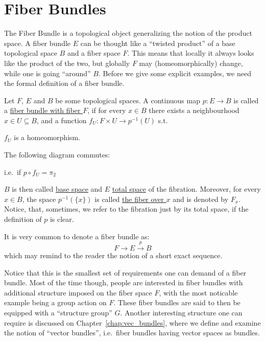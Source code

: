 \chapter{Fiber Bundles}
The Fiber Bundle is a topological object generalizing the notion of the product space. A fiber bundle $E$ can be thought like a ``twisted product'' of a base topological space $B$ and a fiber space $F$. This means that locally it always looks like the product of the two, but globally $F$ may (homeomorphically) change, while one is going ``around'' $B$. Before we give some explicit examples, we need the formal definition of a fiber bundle.

\begin{definition} Let $F$, $E$ and $B$ be some topological spaces. A continuous map $p:E\to B$ is called a \ul{fiber bundle with fiber $F$}, if for every $x\in B$ there exists a neighbourhood $x\in U\subseteq B$, and a function $f_U:F\times U\to p^{-1}(U)$ s.t.
\begin{i_enum}
\item $f_U$ is a homeomorphism.
\item The following diagram commutes:
\begin{center}
\end{center}
i.e.\ if $p\circ f_U=\pi_2$
\end{i_enum}
$B$ is then called \ul{base space} and $E$ \ul{total space} of the fibration. Moreover, for every $x\in B$, the space $p^{-1}(\{x\})$ is called \ul{the fiber over $x$} and is denoted by $F_x$. Notice, that, sometimes, we refer to the fibration just by its total space, if the definition of $p$ is clear.
\end{definition}

\begin{notation}
It is very common to denote a fiber bundle as:
\[F\to E\overset{p}{\to}B\]
which may remind to the reader the notion of a short exact sequence.
\end{notation}

Notice that this is the smallest set of requirements one can demand of a fiber bundle. Most of the time though, people are interested in fiber bundles with additional structure imposed on the fiber space $F$, with the most noticable example being a group action on $F$. These fiber bundles are said to then be equipped with a ``structure group'' $G$. Another interesting structure one can require is discussed on Chapter~\ref{chap:vec_bundles}, where we define and examine the notion of ``vector bundles'', i.e.\ fiber bundles having vector spaces as bundles.

